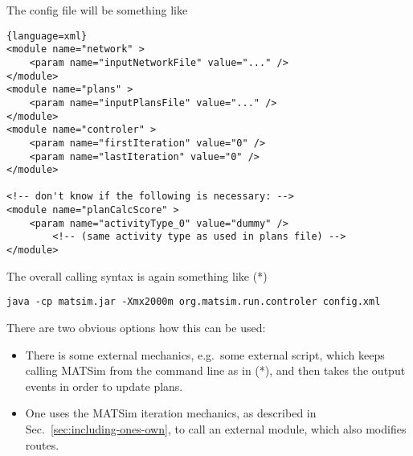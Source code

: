 The config file will be something like
\begin{lstlisting}{language=xml}
<module name="network" >
	<param name="inputNetworkFile" value="..." /> 
</module>
<module name="plans" >
	<param name="inputPlansFile" value="..." />
</module>
<module name="controler" >
	<param name="firstIteration" value="0" />
	<param name="lastIteration" value="0" />
</module>

<!-- don't know if the following is necessary: -->
<module name="planCalcScore" >
	<param name="activityType_0" value="dummy" />
        <!-- (same activity type as used in plans file) -->
</module>
\end{lstlisting}

The overall calling syntax is again something like (*)
\begin{lstlisting}
java -cp matsim.jar -Xmx2000m org.matsim.run.controler config.xml 
\end{lstlisting}

There are two obvious options how this can be used:
\begin{itemize}
\item There is some external mechanics, e.g.\ some external script, which keeps calling MATSim from the command line as in (*), and then takes the output events in order to update plans.
\item One uses the MATSim iteration mechanics, as described in Sec.~\ref{sec:including-ones-own}, to call an external module, which also modifies routes. 
\end{itemize}





